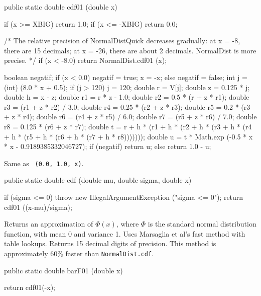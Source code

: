 \begin{code}
   public static double cdf01 (double x) \begin{hide} {
      if (x >= XBIG)
        return 1.0;
      if (x <= -XBIG)
        return 0.0;

      /* The relative precision of NormalDistQuick decreases gradually:
         at x = -8, there are 15 decimals; at x = -26, there are about
         2 decimals. NormalDist is more precise. */
      if (x < -8.0)
        return NormalDist.cdf01 (x);

      boolean negatif;
      if (x < 0.0) {
         negatif = true;
         x = -x;
      } else {
          negatif = false;
      }
      int j = (int) (8.0 * x + 0.5);
      if (j > 120)
          j = 120;
      double r = V[j];
      double z = 0.125 * j;
      double h = x - z;
      double r1 = r * z - 1.0;
      double r2 = 0.5 * (r + z * r1);
      double r3 = (r1 + z * r2) / 3.0;
      double r4 = 0.25 * (r2 + z * r3);
      double r5 = 0.2 * (r3 + z * r4);
      double r6 = (r4 + z * r5) / 6.0;
      double r7 = (r5 + z * r6) / 7.0;
      double r8 = 0.125 * (r6 + z * r7);
      double t = r + h * (r1 + h * (r2 + h * (r3 + 
                h * (r4 + h * (r5 + h * (r6 + h * (r7 + h * r8)))))));
      double u = t * Math.exp (-0.5 * x * x - 0.9189385332046727);
      if (negatif)
          return u;
      else
          return 1.0 - u;
   }\end{hide}
\end{code}
\begin{tabb} 
Same as ~\texttt{(0.0, 1.0, x)}.
\end{tabb}
\begin{code}

   public static double cdf (double mu, double sigma, double x) \begin{hide} {
      if (sigma <= 0)
         throw new IllegalArgumentException ("sigma <= 0");
      return cdf01 ((x-mu)/sigma);
   }\end{hide}
\end{code}
\begin{tabb}  
  Returns an approximation of $\Phi(x)$,  where $\Phi$ is the standard
  normal distribution function, with mean 0 and variance 1.
  Uses Marsaglia et al's \cite{rMAR94b} fast method
  with table lookups. Returns 15 decimal digits of precision.
  This method is approximately 60\% faster than \texttt{NormalDist.cdf}.
\end{tabb}
\begin{code}

   public static double barF01 (double x) \begin{hide} {
      return cdf01(-x);
   }\end{hide}
\end{code}
